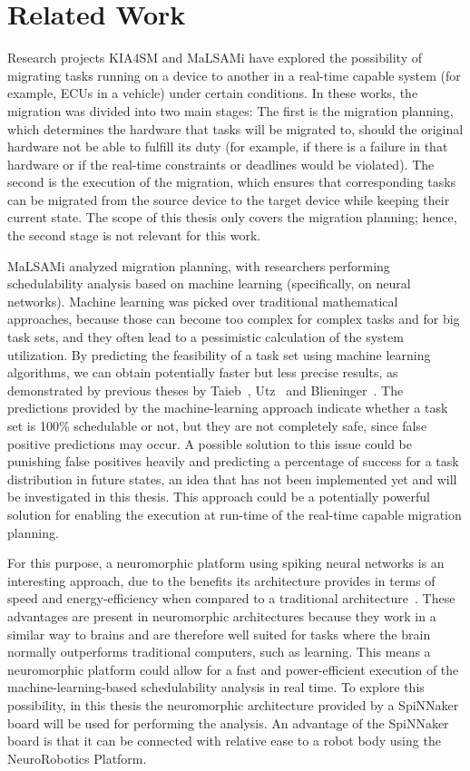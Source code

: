\section*{Related Work}\label{section:relatedwork}
Research projects KIA4SM and MaLSAMi have explored the possibility of migrating tasks running on a device to another in a real-time capable system (for example, ECUs in a vehicle) under certain conditions. In these works, the migration was divided into two main stages: The first is the migration planning, which determines the hardware that tasks will be migrated to, should the original hardware not be able to fulfill its duty (for example, if there is a failure in that hardware or if the real-time constraints or deadlines would be violated). The second is the execution of the migration, which ensures that corresponding tasks can be migrated from the source device to the target device while keeping their current state. The scope of this thesis only covers the migration planning; hence, the second stage is not relevant for this work.

MaLSAMi analyzed migration planning, with researchers performing schedulability analysis based on machine learning (specifically, on neural networks). Machine learning was picked over traditional mathematical approaches, because those can become too complex for complex tasks and  for big task sets, and they often lead to a pessimistic calculation of the system utilization. By predicting the feasibility of a task set using machine learning algorithms, we can obtain potentially faster but less precise results, as demonstrated by previous theses by Taieb~\parencite{taieb1}, Utz~\parencite{utz1} and Blieninger~\parencite{blieninger1}. The predictions provided by the machine-learning approach indicate whether a task set is 100\% schedulable or not, but they are not completely safe, since false positive predictions may occur. A possible solution to this issue could be punishing false positives heavily and predicting a percentage of success for a task distribution in future states, an idea that has not been implemented yet and will be investigated in this thesis. This approach could be a potentially powerful solution for enabling the execution at run-time of the real-time capable migration planning.

For this purpose, a neuromorphic platform using spiking neural networks is an interesting approach, due to the benefits its architecture provides in terms of speed and energy-efficiency when compared to a traditional architecture~\parencite{bersuker1}. These advantages are present in neuromorphic architectures because they work in a similar way to brains and are therefore well suited for tasks where the brain normally outperforms traditional computers, such as learning. This means a neuromorphic platform could allow for a fast and power-efficient execution of the machine-learning-based schedulability analysis in real time. To explore this possibility, in this thesis the neuromorphic architecture provided by a SpiNNaker board will be used for performing the analysis. An advantage of the SpiNNaker board is that it can be connected with relative ease to a robot body using the NeuroRobotics Platform.

